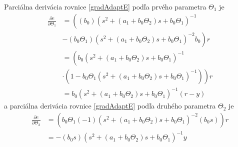 \documentclass[a4paper, 10pt, ]{article}
\begin{document}
Parciálna derivácia rovnice \eqref{gradAdaptE} podľa prvého parametra $\Theta_1$ je
\begin{equation} \label{citl1Neaprox}
\begin{split}
	\frac{\partial e}{\partial \Theta_1}
	&=
	\left(
		\left(
			b_0
		\right)
		\left(
			s^2 + \left( a_1 + b_0 \Theta_2 \right) s + b_0 \Theta_1
		\right)^{-1}
	\right.
	\\ & -
	\left.
		\left(
			b_0 \Theta_1
		\right)
			\left(
			s^2 + \left(a_1 + b_0 \Theta_2 \right) s + b_0 \Theta_1
			\right)^{-2}
		b_0
		\right)
	r
	\\ & =
	\left(
		b_0
		\left(
			s^2 + \left( a_1 + b_0 \Theta_2 \right) s + b_0 \Theta_1
		\right)^{-1}
	\right.
	\\ & \cdot
	\left.
		\left(
		1
		-
			b_0 \Theta_1
		\left(
			s^2 + \left(a_1 + b_0 \Theta_2 \right) s + b_0 \Theta_1
			\right)^{-1}
		\right)
	\right)
	r
	\\& =
		b_0
		\left(
			s^2 + \left( a_1 + b_0 \Theta_2 \right) s + b_0 \Theta_1
		\right)^{-1}
	\left(
		r
		-
		y
	\right)
	\end{split}
\end{equation}
a parciálna derivácia rovnice \eqref{gradAdaptE} podľa druhého parametra $\Theta_2$ je
\begin{equation} \label{citl2Neaprox}
\begin{split}
	\frac{\partial e}{\partial {\Theta_2}}
	 & =
	\left(
		b_0 \Theta_1
		(-1)
		\left(
			s^2 + \left( a_1 + b_0 \Theta_2 \right) s + b_0 \Theta_1
		\right)^{-2}
		\left(
			b_0 s
		\right)
	\right)
	r
	\\ & =
	-
	\left(
		b_0 s
	\right)
	\left(
		s^2 + \left( a_1 + b_0 \Theta_2 \right) s + b_0 \Theta_1
		\right)^{-1}
		y
	\end{split}
\end{equation}
\end{document}
